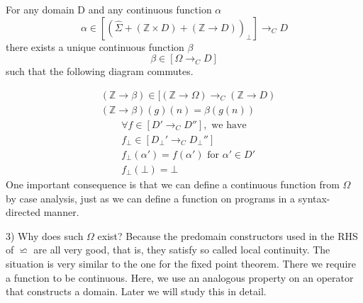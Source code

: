 \documentclass{report}[12pt]
\begin{document}
For any domain D and any continuous function $\alpha$
\[\alpha \in [(\hat \Sigma + (\mathbb{Z} \times D) + (\mathbb{Z}\rightarrow D))_\bot] \rightarrow_C D\]
there exists a unique continuous function $\beta$
\[\beta \in [\Omega \rightarrow_C D]\]
such that the following diagram commutes. \\

\begin{align*}
  &(\mathbb{Z} \rightarrow \beta) \in [(\mathbb{Z}\rightarrow \Omega) \rightarrow_C (\mathbb{Z}\rightarrow D) \\
  &(\mathbb{Z} \rightarrow \beta) (g) (n) = \beta(g(n))
\end{align*}
\begin{align*}
  &\forall f \in [D' \rightarrow_C D''], \text{ we have} \\
  &f_\bot \in [D_\bot' \rightarrow_C D_\bot ''] \\
  &f_\bot (\alpha') = f(\alpha') \text{ for }\alpha' \in D' \\
  &f_\bot (\bot) = \bot
\end{align*}
One important consequence is that we can define a continuous function from $\Omega$ by case analysis, just as we can define a function on programs in a syntax-directed manner.

3) Why does such $\Omega$ exist? Because the predomain constructors used in the RHS of $\backsimeq$ are all very good, that is, they satisfy so called local continuity. The situation is very similar to the one for the fixed point theorem. There we require a function to be continuous. Here, we use an analogous property on an operator that constructs a domain. Later we will study this in detail.
\end{document}
